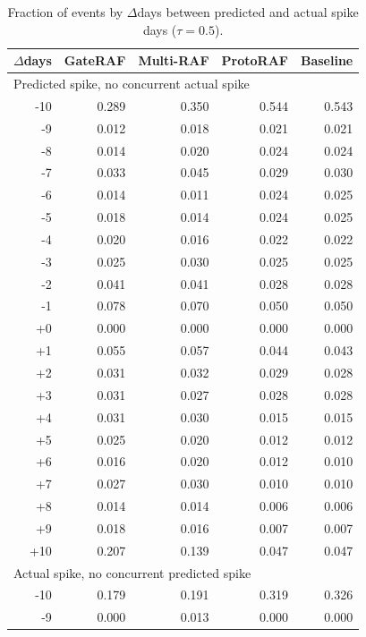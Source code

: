 \begin{table}[t]
    \caption{Fraction of events by $\Delta$days between predicted and actual spike days ($\tau=0.5$).}
    \label{tab:temporal_proximity}
    \centering
    \begin{tabular}{rrrrr}
    \hline
    \multicolumn{1}{c}{$\Delta$days} & \multicolumn{1}{c}{\textbf{GateRAF}} & \multicolumn{1}{c}{\textbf{Multi-RAF}} & \multicolumn{1}{c}{\textbf{ProtoRAF}} & \multicolumn{1}{c}{\textbf{Baseline}} \\
    \hline\hline
    \multicolumn{5}{l}{Predicted spike, no concurrent actual spike} \\
    -10 & 0.289 & 0.350 & 0.544 & 0.543 \\
    -9 & 0.012 & 0.018 & 0.021 & 0.021 \\
    -8 & 0.014 & 0.020 & 0.024 & 0.024 \\
    -7 & 0.033 & 0.045 & 0.029 & 0.030 \\
    -6 & 0.014 & 0.011 & 0.024 & 0.025 \\
    -5 & 0.018 & 0.014 & 0.024 & 0.025 \\
    -4 & 0.020 & 0.016 & 0.022 & 0.022 \\
    -3 & 0.025 & 0.030 & 0.025 & 0.025 \\
    -2 & 0.041 & 0.041 & 0.028 & 0.028 \\
    -1 & 0.078 & 0.070 & 0.050 & 0.050 \\
    +0 & 0.000 & 0.000 & 0.000 & 0.000 \\
    +1 & 0.055 & 0.057 & 0.044 & 0.043 \\
    +2 & 0.031 & 0.032 & 0.029 & 0.028 \\
    +3 & 0.031 & 0.027 & 0.028 & 0.028 \\
    +4 & 0.031 & 0.030 & 0.015 & 0.015 \\
    +5 & 0.025 & 0.020 & 0.012 & 0.012 \\
    +6 & 0.016 & 0.020 & 0.012 & 0.010 \\
    +7 & 0.027 & 0.030 & 0.010 & 0.010 \\
    +8 & 0.014 & 0.014 & 0.006 & 0.006 \\
    +9 & 0.018 & 0.016 & 0.007 & 0.007 \\
    +10 & 0.207 & 0.139 & 0.047 & 0.047 \\
    \hline
    \multicolumn{5}{l}{Actual spike, no concurrent predicted spike} \\
    -10 & 0.179 & 0.191 & 0.319 & 0.326 \\
    -9 & 0.000 & 0.013 & 0.000 & 0.000 \\

\end{tabular}
\end{table}
